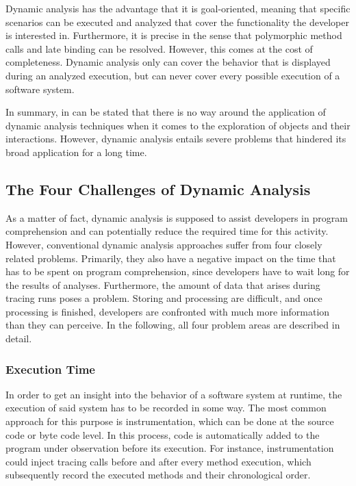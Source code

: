 Dynamic analysis has the advantage that it is goal-oriented, meaning that specific scenarios can be executed and analyzed that cover the functionality the developer is interested in.
Furthermore, it is precise in the sense that polymorphic method calls and late binding can be resolved.
However, this comes at the cost of completeness.
Dynamic analysis only can cover the behavior that is displayed during an analyzed execution, but can never cover every possible execution of a software system.

In summary, in can be stated that there is no way around the application of dynamic analysis techniques when it comes to the exploration of objects and their interactions.
However, dynamic analysis entails severe problems that hindered its broad application for a long time.

\subsection{The Four Challenges of Dynamic Analysis}
\label{ss:BackgroundAnalysisProblems}
As a matter of fact, dynamic analysis is supposed to assist developers in program comprehension and can potentially reduce the required time for this activity.
However, conventional dynamic analysis approaches suffer from four closely related problems.
Primarily, they also have a negative impact on the time that has to be spent on program comprehension, since developers have to wait long for the results of analyses.
Furthermore, the amount of data that arises during tracing runs poses a problem. 
Storing and processing are difficult, and once processing is finished, developers are confronted with much more information than they can perceive.
In the following, all four problem areas are described in detail.

\subsubsection{Execution Time}
In order to get an insight into the behavior of a software system at runtime, the execution of said system has to be recorded in some way.
The most common approach for this purpose is instrumentation, which can be done at the source code or byte code level.
In this process, code is automatically added to the program under observation before its execution.
For instance, instrumentation could inject tracing calls before and after every method execution, which subsequently record the executed methods and their chronological order.

